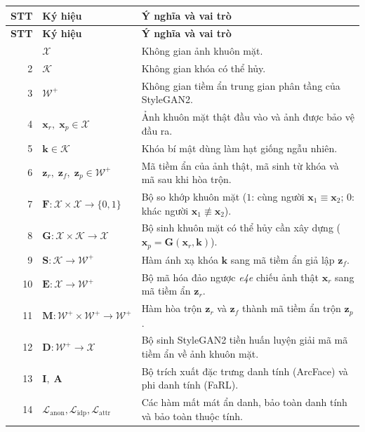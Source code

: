 \documentclass[oneside,a4paper,12pt]{extarticle}
\begin{document}
{\small
\renewcommand{\theHtable}{glossary.sym.\arabic{table}}
\begin{longtable}{r l >{\raggedright\arraybackslash}p{8.8cm}}
\toprule
\textbf{STT} & \textbf{Ký hiệu} & \textbf{Ý nghĩa và vai trò} \\
\midrule
\endfirsthead
\toprule
\textbf{STT} & \textbf{Ký hiệu} & \textbf{Ý nghĩa và vai trò} \\
\midrule
\endhead
\bottomrule
\endfoot
1 & $\mathcal{X}$ & Không gian ảnh khuôn mặt. \\
2 & $\mathcal{K}$ & Không gian khóa có thể hủy. \\
3 & $\mathcal{W}^+$ & Không gian tiềm ẩn trung gian phân tầng của StyleGAN2. \\
4 & $\mathbf{x}_r,\; \mathbf{x}_p \in \mathcal{X}$ & Ảnh khuôn mặt thật đầu vào và ảnh được bảo vệ đầu ra. \\
5 & $\mathbf{k} \in \mathcal{K}$ & Khóa bí mật dùng làm hạt giống ngẫu nhiên. \\
6 & $\mathbf{z}_r,\; \mathbf{z}_f,\; \mathbf{z}_p \in \mathcal{W}^+$ & Mã tiềm ẩn của ảnh thật, mã sinh từ khóa và mã sau khi hòa trộn. \\
7 & $\mathbf{F} : \mathcal{X} \times \mathcal{X} \rightarrow \{0, 1\}$ & Bộ so khớp khuôn mặt ($1$: cùng người $\mathbf{x}_1 \equiv \mathbf{x}_2$; $0$: khác người $\mathbf{x}_1 \not\equiv \mathbf{x}_2$). \\
8 & $\mathbf{G} : \mathcal{X} \times \mathcal{K} \rightarrow \mathcal{X}$ & Bộ sinh khuôn mặt có thể hủy cần xây dựng ($\mathbf{x}_p = \mathbf{G}(\mathbf{x}_r, \mathbf{k})$). \\
9 & $\mathbf{S} : \mathcal{K} \rightarrow \mathcal{W}^+$ & Hàm ánh xạ khóa $\mathbf{k}$ sang mã tiềm ẩn giả lập $\mathbf{z}_f$. \\
10 & $\mathbf{E} : \mathcal{X} \rightarrow \mathcal{W}^+$ & Bộ mã hóa đảo ngược \textit{e4e} chiếu ảnh thật $\mathbf{x}_r$ sang mã tiềm ẩn $\mathbf{z}_r$. \\
11 & $\mathbf{M} : \mathcal{W}^+ \times \mathcal{W}^+ \rightarrow \mathcal{W}^+$ & Hàm hòa trộn $\mathbf{z}_r$ và $\mathbf{z}_f$ thành mã tiềm ẩn trộn $\mathbf{z}_p$. \\
12 & $\mathbf{D} : \mathcal{W}^+ \rightarrow \mathcal{X}$ & Bộ sinh StyleGAN2 tiền huấn luyện giải mã mã tiềm ẩn về ảnh khuôn mặt. \\
13 & $\mathbf{I},\; \mathbf{A}$ & Bộ trích xuất đặc trưng danh tính (ArcFace) và phi danh tính (FaRL). \\
14 & $\mathcal{L}_{\text{anon}}, \mathcal{L}_{\text{idp}}, \mathcal{L}_{\text{attr}}$ & Các hàm mất mát ẩn danh, bảo toàn danh tính và bảo toàn thuộc tính. \\

\end{longtable}}
\end{document}
